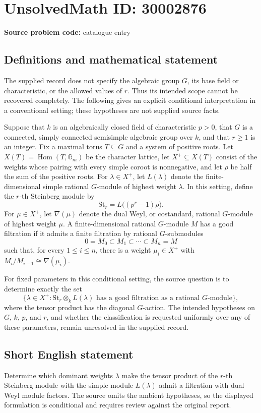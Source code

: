 \documentclass[11pt]{article}
\begin{document}
\section*{UnsolvedMath ID: 30002876}
\textbf{Source problem code:} catalogue entry
\subsection{Definitions and mathematical statement}
The supplied record does not specify the algebraic group \(G\), its base field or characteristic, or the allowed values of \(r\). Thus its intended scope cannot be recovered completely. The following gives an explicit conditional interpretation in a conventional setting; these hypotheses are not supplied source facts.

Suppose that \(k\) is an algebraically closed field of characteristic \(p>0\), that \(G\) is a connected, simply connected semisimple algebraic group over \(k\), and that \(r\geq 1\) is an integer. Fix a maximal torus \(T\subseteq G\) and a system of positive roots. Let \(X(T)=\operatorname{Hom}(T,\mathbb G_m)\) be the character lattice, let \(X^+\subseteq X(T)\) consist of the weights whose pairing with every simple coroot is nonnegative, and let \(\rho\) be half the sum of the positive roots. For \(\lambda\in X^+\), let \(L(\lambda)\) denote the finite-dimensional simple rational \(G\)-module of highest weight \(\lambda\). In this setting, define the \(r\)-th Steinberg module by
\[
\mathrm{St}_r=L\bigl((p^r-1)\rho\bigr).
\]
For \(\mu\in X^+\), let \(\nabla(\mu)\) denote the dual Weyl, or costandard, rational \(G\)-module of highest weight \(\mu\). A finite-dimensional rational \(G\)-module \(M\) has a good filtration if it admits a finite filtration by rational \(G\)-submodules
\[
0=M_0\subset M_1\subset\cdots\subset M_n=M
\]
such that, for every \(1\leq i\leq n\), there is a weight \(\mu_i\in X^+\) with \(M_i/M_{i-1}\cong\nabla(\mu_i)\).

For fixed parameters in this conditional setting, the source question is to determine exactly the set
\[
\bigl\{\lambda\in X^+ : \mathrm{St}_r\otimes_k L(\lambda)\text{ has a good filtration as a rational }G\text{-module}\bigr\},
\]
where the tensor product has the diagonal \(G\)-action. The intended hypotheses on \(G\), \(k\), \(p\), and \(r\), and whether the classification is requested uniformly over any of these parameters, remain unresolved in the supplied record.
\subsection{Short English statement}
Determine which dominant weights \(\lambda\) make the tensor product of the \(r\)-th Steinberg module with the simple module \(L(\lambda)\) admit a filtration with dual Weyl module factors. The source omits the ambient hypotheses, so the displayed formulation is conditional and requires review against the original report.
\end{document}
